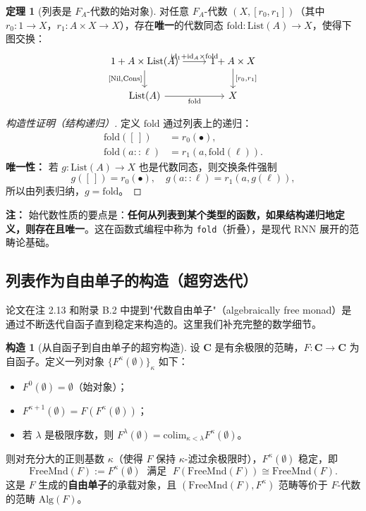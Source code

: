 \documentclass[12pt,a4paper]{ctexart}
\theoremstyle{definition}
\newtheorem{theorem}[definition]{定理}
\newtheorem{construction}[definition]{构造}
\newcommand{\cat}[1]{\mathbf{#1}}
\newcommand{\id}{\mathrm{id}}
\newcommand{\Alg}{\mathrm{Alg}}
\newcommand{\FreeMnd}{\mathrm{FreeMnd}}
\newcommand{\List}{\mathrm{List}}
\newcommand{\colim}{\mathrm{colim}}
\newcommand{\fold}{\mathrm{fold}}
\begin{document}
\begin{theorem}[列表是 $F_A$-代数的始对象]\label{thm:list-initial}
对任意 $F_A$-代数 $(X,[r_0,r_1])$（其中 $r_0:1\to X$，$r_1:A\times X\to X$），存在\textbf{唯一}的代数同态 $\fold:\List(A)\to X$，使得下图交换：
\[
\begin{tikzcd}
1+A\times\List(A) \arrow[r,"\id_1+\id_A\times\fold"] \arrow[d,"{[\mathrm{Nil},\mathrm{Cons}]}"'] & 1+A\times X \arrow[d,"{[r_0,r_1]}"] \\
\List(A) \arrow[r,"\fold"'] & X
\end{tikzcd}
\]
\end{theorem}

\begin{proof}[构造性证明（结构递归）]
定义 $\fold$ 通过列表上的递归：
\begin{align*}
\fold([\,]) &= r_0(\bullet),\\
\fold(a::\ell) &= r_1(a,\fold(\ell)).
\end{align*}
\textbf{唯一性：} 若 $g:\List(A)\to X$ 也是代数同态，则交换条件强制
\[g([\,])=r_0(\bullet),\quad g(a::\ell)=r_1(a,g(\ell)),\]
所以由列表归纳，$g=\fold$。
\end{proof}

\textbf{注：} 始代数性质的要点是：\textbf{任何从列表到某个类型的函数，如果结构递归地定义，则存在且唯一}。这在函数式编程中称为 \texttt{fold}（折叠），是现代 RNN 展开的范畴论基础。

\subsection{列表作为自由单子的构造（超穷迭代）}

论文在注 2.13 和附录 B.2 中提到"代数自由单子"（algebraically free monad）是通过不断迭代自函子直到稳定来构造的。这里我们补充完整的数学细节。

\begin{construction}[从自函子到自由单子的超穷构造]\label{cons:free-monad}
设 $\cat C$ 是有余极限的范畴，$F:\cat C\to\cat C$ 为自函子。定义一列对象 $\{F^\kappa(\emptyset)\}_{\kappa}$ 如下：
\begin{itemize}[nosep]
    \item $F^0(\emptyset)=\emptyset$（始对象）；
    \item $F^{\kappa+1}(\emptyset)=F(F^\kappa(\emptyset))$；
    \item 若 $\lambda$ 是极限序数，则 $F^\lambda(\emptyset)=\displaystyle\colim_{\kappa<\lambda}F^\kappa(\emptyset)$。
\end{itemize}
则对充分大的正则基数 $\kappa$（使得 $F$ 保持 $\kappa$-滤过余极限时），$F^\kappa(\emptyset)$ 稳定，即
\[\FreeMnd(F):=F^\kappa(\emptyset)\;\text{ 满足 }\;F(\FreeMnd(F))\cong\FreeMnd(F).\]
这是 $F$ 生成的\textbf{自由单子}的承载对象，且 $(\FreeMnd(F),F^\kappa)$ 范畴等价于 $F$-代数的范畴 $\Alg(F)$。
\end{construction}
\end{document}
